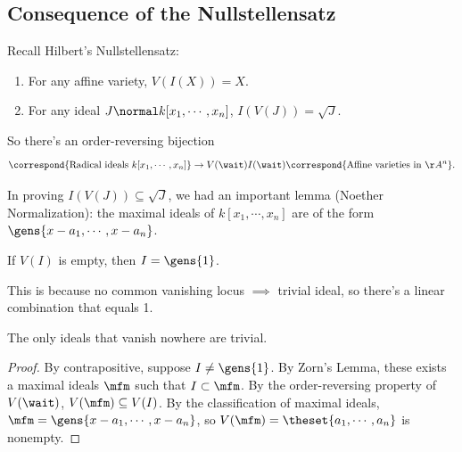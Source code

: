 \hypertarget{consequence-of-the-nullstellensatz}{%
\subsection{Consequence of the
Nullstellensatz}\label{consequence-of-the-nullstellensatz}}

Recall Hilbert's Nullstellensatz:

\begin{enumerate}
\def\labelenumi{\alph{enumi}.}
\item
  For any affine variety, \(V(I(X)) = X\).
\item
  For any ideal \(J\normal k[x_1, \cdots, x_n]\),
  \(I(V(J)) = \sqrt{J}\).
\end{enumerate}

So there's an order-reversing bijection
\begin{align*}  
\correspond{\text{Radical ideals } k[x_1, \cdots, x_n]} \to{V(\wait)}{I(\wait)}
\correspond{\text{Affine varieties in } \AA^n}
.\end{align*}

In proving \(I(V(J)) \subseteq \sqrt{J}\), we had an important lemma
(Noether Normalization): the maximal ideals of \(k[x_1, \cdots, x_n]\)
are of the form \(\gens{x-a_1, \cdots, x-a_n}\).

\begin{corollary}[?]

If \(V(I)\) is empty, then \(I = \gens{1}\).

\end{corollary}

\begin{remark}

This is because no common vanishing locus \(\implies\) trivial ideal, so
there's a linear combination that equals 1.

\end{remark}

\begin{slogan}

The only ideals that vanish nowhere are trivial.

\end{slogan}

\begin{proof}

By contrapositive, suppose \(I\neq \gens{1}\). By Zorn's Lemma, these
exists a maximal ideals \(\mfm\) such that \(I \subset \mfm\). By the
order-reversing property of \(V(\wait)\), \(V(\mfm) \subseteq V(I)\). By
the classification of maximal ideals,
\(\mfm = \gens{x-a_1, \cdots, x-a_n}\), so
\(V(\mfm) = \theset{a_1, \cdots, a_n}\) is nonempty.

\end{proof}

